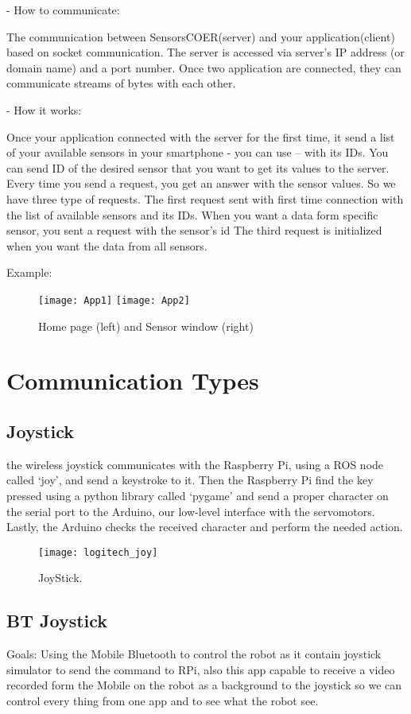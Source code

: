 	- How to communicate: 
	
	The communication between SensorsCOER(server) and your application(client) based on socket communication. The server is accessed via server's IP address (or domain name) and a port number. Once two application are connected, they can communicate streams of bytes with each other.  
	
	- How it works: 
	
	Once your application connected with the server for the first time, it send a list of your available sensors in your smartphone - you can use – with its IDs. You can send ID of the desired sensor that you want to get its values to the server. Every time you send a request, you get an answer with the sensor values. So we have three type of requests. 
	The first request sent with first time connection with the list of available sensors and its IDs. 
	When you want a data form specific sensor, you sent a request with the sensor's id The third request is initialized when you want the data from all sensors. 

	Example:
	\begin{figure}[h]		
	\centering
	\texttt{[image: App1]}\quad
    	\texttt{[image: App2]}
	\caption{Home page (left) and Sensor window (right)}
	\label{Fig:App1}
\end{figure}




\section{Communication Types}

	
	\subsection{Joystick}
	the wireless joystick communicates with the Raspberry Pi, using a ROS node called ‘joy’, and send a keystroke to it. Then the Raspberry Pi find the key pressed using a python library called ‘pygame’ and send a proper character on the serial port to the Arduino, our low-level interface with the servomotors. Lastly, the Arduino checks the received character and perform the needed action.
	\begin{figure}[h]		
		\centering
		\texttt{[image: logitech\_joy]}
		\caption{JoyStick.}
		\label{Fig:joy}
	\end{figure}

	\subsection{BT Joystick}
	Goals:
		Using the Mobile  Bluetooth to control the robot as it contain joystick simulator to send the command to RPi, also this app capable to receive a video recorded form the Mobile on the robot as a background to the joystick so we can control every thing from one app and to see what the robot see.
		
